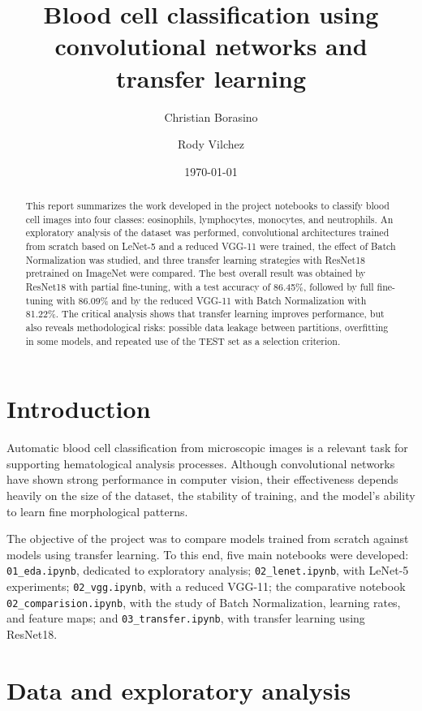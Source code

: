 \documentclass[11pt,a4paper]{article}
\title{\textbf{Blood cell classification using convolutional networks and transfer learning}}
\author{Christian Borasino \and Rody Vilchez}
\date{\today}
\begin{document}
\maketitle

\begin{abstract}
This report summarizes the work developed in the project notebooks to classify blood cell images into four classes: eosinophils, lymphocytes, monocytes, and neutrophils. An exploratory analysis of the dataset was performed, convolutional architectures trained from scratch based on LeNet-5 and a reduced VGG-11 were trained, the effect of Batch Normalization was studied, and three transfer learning strategies with ResNet18 pretrained on ImageNet were compared. The best overall result was obtained by ResNet18 with partial fine-tuning, with a test accuracy of 86.45\%, followed by full fine-tuning with 86.09\% and by the reduced VGG-11 with Batch Normalization with 81.22\%. The critical analysis shows that transfer learning improves performance, but also reveals methodological risks: possible data leakage between partitions, overfitting in some models, and repeated use of the TEST set as a selection criterion.
\end{abstract}

\section{Introduction}

Automatic blood cell classification from microscopic images is a relevant task for supporting hematological analysis processes. Although convolutional networks have shown strong performance in computer vision, their effectiveness depends heavily on the size of the dataset, the stability of training, and the model's ability to learn fine morphological patterns.

The objective of the project was to compare models trained from scratch against models using transfer learning. To this end, five main notebooks were developed: \texttt{01\_eda.ipynb}, dedicated to exploratory analysis; \texttt{02\_lenet.ipynb}, with LeNet-5 experiments; \texttt{02\_vgg.ipynb}, with a reduced VGG-11; the comparative notebook \texttt{02\_comparision.ipynb}, with the study of Batch Normalization, learning rates, and feature maps; and \texttt{03\_transfer.ipynb}, with transfer learning using ResNet18.

\section{Data and exploratory analysis}
\end{document}

